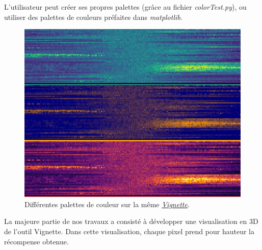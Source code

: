 \documentclass[12pt]{article}
\begin{document}
L'utilisateur peut créer ses propres palettes (grâce au fichier \emph{colorTest.py}), ou utiliser des palettes de couleurs préfaites dans \emph{matplotlib}. \\

\begin{figure}[htp]
    \centering
    \includegraphics[width=15cm]{Images/palette}
    \caption{Différentes palettes de couleur sur la même \hyperref[fig:vignettePendulum]{\emph{Vignette}}.}
    \label{fig:palette}
\end{figure}

La majeure partie de nos travaux a consisté à développer une visualisation en 3D de l'outil Vignette. Dans cette visualisation, chaque pixel prend pour hauteur la récompense obtenue. \\
\end{document}
